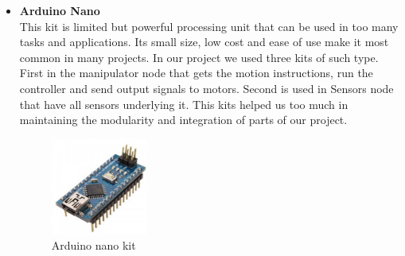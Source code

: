 \documentclass[12pt]{book}
\begin{document}
\begin{itemize}
	\item \textbf{Arduino Nano}\\
	This kit is limited but powerful processing unit that can be used in too many tasks and applications. Its small size, low cost and ease of use make it most common in many projects. In our project we used three kits of such type. First in the manipulator node that gets the motion instructions, run the controller and send output signals to motors. Second is used in Sensors node that have all sensors underlying it. This kits helped us too much in maintaining the modularity and integration of parts of our project.
	
	\begin{figure}
		\centering
		\includegraphics[width =0.3\textwidth]{Fig/Electronics/nano.jpg}
		\caption{Arduino nano kit}
		\label{fig:nano}
	\end{figure}

\end{itemize}
\end{document}
